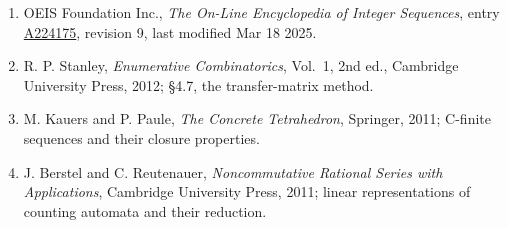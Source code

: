 \documentclass[11pt]{article}
\theoremstyle{definition}
\begin{document}
\begin{enumerate}

\item OEIS Foundation Inc., \emph{The On-Line Encyclopedia of Integer Sequences}, entry \href{https://oeis.org/A224175}{A224175}, revision 9, last modified Mar 18 2025.

\item R. P. Stanley, \emph{Enumerative Combinatorics}, Vol.~1, 2nd ed., Cambridge University Press, 2012; \S4.7, the transfer-matrix method.

\item M. Kauers and P. Paule, \emph{The Concrete Tetrahedron}, Springer, 2011; C-finite sequences and their closure properties.

\item J. Berstel and C. Reutenauer, \emph{Noncommutative Rational Series with Applications}, Cambridge University Press, 2011; linear representations of counting automata and their reduction.

\end{enumerate}
\end{document}

